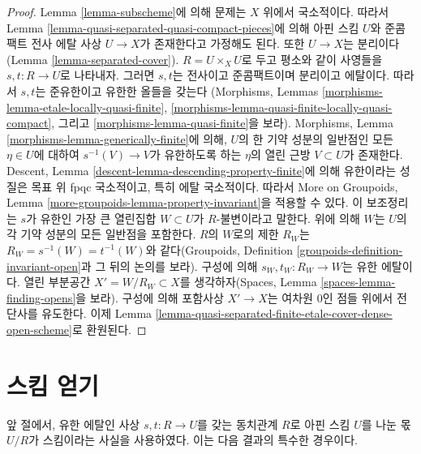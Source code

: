 \begin{proof}
Lemma \ref{lemma-subscheme}에 의해 문제는 $X$ 위에서 국소적이다.
따라서 Lemma \ref{lemma-quasi-separated-quasi-compact-pieces}에 의해
아핀 스킴 $U$와 준콤팩트 전사 에탈 사상 $U \to X$가 존재한다고
가정해도 된다. 또한 $U \to X$는 분리이다
(Lemma \ref{lemma-separated-cover}).
$R = U \times_X U$로 두고 평소와 같이 사영들을
$s, t : R \to U$로 나타내자. 그러면 $s, t$는 전사이고 준콤팩트이며
분리이고 에탈이다. 따라서 $s, t$는 준유한이고 유한한 올들을 갖는다
(Morphisms, Lemmas \ref{morphisms-lemma-etale-locally-quasi-finite},
\ref{morphisms-lemma-quasi-finite-locally-quasi-compact}, 그리고
\ref{morphisms-lemma-quasi-finite}을 보라).
Morphisms, Lemma \ref{morphisms-lemma-generically-finite}에 의해,
$U$의 한 기약 성분의 일반점인 모든 $\eta \in U$에 대하여
$s^{-1}(V) \to V$가 유한하도록 하는 $\eta$의 열린 근방
$V \subset U$가 존재한다. Descent, Lemma
\ref{descent-lemma-descending-property-finite}에 의해 유한이라는 성질은
목표 위 fpqc 국소적이고, 특히 에탈 국소적이다. 따라서 More on Groupoids,
Lemma \ref{more-groupoids-lemma-property-invariant}을 적용할 수 있다.
이 보조정리는 $s$가 유한인 가장 큰 열린집합 $W \subset U$가
$R$-불변이라고 말한다. 위에 의해 $W$는 $U$의 각 기약 성분의 모든
일반점을 포함한다. $R$의 $W$로의 제한 $R_W$는
$R_W = s^{-1}(W) = t^{-1}(W)$와 같다(Groupoids, Definition
\ref{groupoids-definition-invariant-open}과 그 뒤의 논의를 보라).
구성에 의해 $s_W, t_W : R_W \to W$는 유한 에탈이다.
열린 부분공간 $X' = W/R_W \subset X$를 생각하자(Spaces, Lemma
\ref{spaces-lemma-finding-opens}을 보라). 구성에 의해 포함사상
$X' \to X$는 여차원 $0$인 점들 위에서 전단사를 유도한다.
이제 Lemma
\ref{lemma-quasi-separated-finite-etale-cover-dense-open-scheme}로 환원된다.
\end{proof}

\section{스킴 얻기}
\label{section-getting-a-scheme}

\noindent
앞 절에서, 유한 에탈인 사상 $s, t : R \to U$를 갖는 동치관계 $R$로
아핀 스킴 $U$를 나눈 몫 $U/R$가 스킴이라는 사실을 사용하였다.
이는 다음 결과의 특수한 경우이다.

